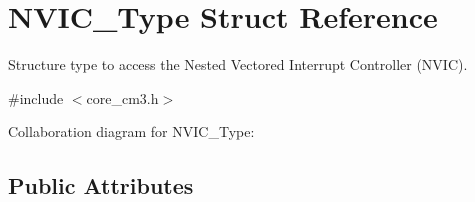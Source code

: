 \hypertarget{structNVIC__Type}{}\section{N\+V\+I\+C\+\_\+\+Type Struct Reference}
\label{structNVIC__Type}


Structure type to access the Nested Vectored Interrupt Controller (N\+V\+IC).  




{\ttfamily \#include $<$core\+\_\+cm3.\+h$>$}



Collaboration diagram for N\+V\+I\+C\+\_\+\+Type\+:
\subsection*{Public Attributes}
